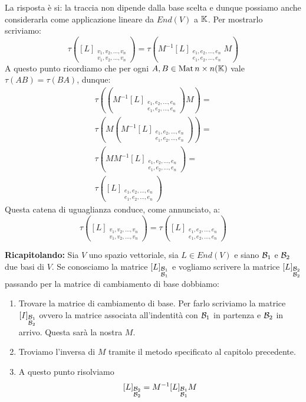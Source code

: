 La risposta è si: la traccia non dipende dalla base scelta e dunque possiamo
anche considerarla come applicazione lineare da $End(V)$ a $\mathbb{K}$.
Per mostrarlo scriviamo:
\[
	\tau \left(
	[L]_{\substack{
			v_1, v_2, \dots, v_n \\
			v_1, v_2, \dots, v_n
		}}
	\right) =
	\tau \left(
	M^{-1} [L]_{\substack{
			e_1, e_2, \dots, e_n \\
			e_1, e_2, \dots, e_n
		}} M
	\right)
\]
A questo punto ricordiamo che per ogni $A, B \in \operatorname{Mat}{n \times n}(\mathbb{K})$
vale $\tau(AB) = \tau(BA)$, dunque:
\begin{gather*}
	\tau \left(
	\left(
		M^{-1}[L]_{\substack{
				e_1, e_2, \dots, e_n\\
				e_1, e_2, \dots, e_n
			}}
		\right) M
	\right) =\\
	\tau \left(
	M \left(
		M^{-1}[L]_{\substack{
				e_1, e_2, \dots, e_n\\
				e_1, e_2, \dots, e_n
			}}
		\right)
	\right) =\\
	\tau \left(
	M M^{-1} [L]_{\substack{
			e_1, e_2, \dots, e_n\\
			e_1, e_2, \dots, e_n
		}}
	\right) =\\
	\tau \left(
	[L]_{\substack{
			e_1, e_2, \dots, e_n \\
			e_1, e_2, \dots, e_n
		}}
	\right)
\end{gather*}
Questa catena di uguaglianza conduce, come annunciato, a:
\[
	\tau \left(
	[L]_{\substack{
			v_1, v_2, \dots, v_n \\
			v_1, v_2, \dots, v_n
		}}
	\right) =
	\tau \left(
	[L]_{\substack{
			e_1, e_2, \dots, e_n \\
			e_1, e_2, \dots, e_n
		}}
	\right)
\]

\textbf{Ricapitolando:} Sia $V$ uno spazio vettoriale, sia $L \in End(V)$ e siano
$\mathcal{B}_1$ e $\mathcal{B}_2$ due basi di $V$. Se conosciamo la matrice
$[L]_{\substack{\mathcal{B}_1 \\ \mathcal{B}_1}}$ e vogliamo scrivere la matrice
$[L]_{\substack{\mathcal{B}_2 \\ \mathcal{B}_2}}$ passando per la matrice di
cambiamento di base dobbiamo:
\begin{enumerate}
	\item Trovare la matrice di cambiamento di base. Per farlo scriviamo la
	      matrice $[I]_{\substack{\mathcal{B}_1 \\ \mathcal{B}_2}}$ ovvero la
	      matrice associata all'indentità con $\mathcal{B}_1$ in partenza e
	      $\mathcal{B}_2$ in arrivo. Questa sarà la nostra $M$.
	\item Troviamo l'inversa di $M$ tramite il metodo specificato al capitolo
	      precedente.
	\item A questo punto risolviamo
	      \[
		      [L]_{\substack{\mathcal{B}_2 \\ \mathcal{B}_2}} =
		      M^{-1} [L]_{\substack{\mathcal{B}_1 \\ \mathcal{B}_1}} M
	      \]
\end{enumerate}

